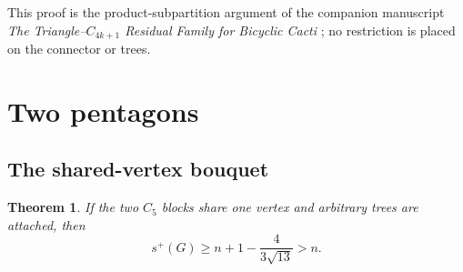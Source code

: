 \documentclass[11pt]{article}
\newtheorem{theorem}{Theorem}[section]
\theoremstyle{remark}
\begin{document}
This proof is the product-subpartition argument of the companion manuscript
\emph{The Triangle--$C_{4k+1}$ Residual Family for Bicyclic Cacti}
\cite{MixedCompanion}; no restriction is placed on the connector or trees.

\section{Two pentagons}

\subsection{The shared-vertex bouquet}

\begin{theorem}\label{thm:bouquet}
If the two $C_5$ blocks share one vertex and arbitrary trees are attached,
then
\[
 s^+(G)\geq n+1-\frac4{3\sqrt{13}}>n.
\]
\end{theorem}
\end{document}
